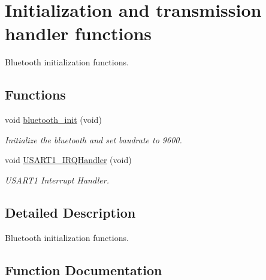 \hypertarget{group___bluetooth___init}{}\section{Initialization and transmission handler functions}
\label{group___bluetooth___init}


Bluetooth initialization functions.  


\subsection*{Functions}
\begin{DoxyCompactItemize}
\item 
void \hyperlink{group___bluetooth___init_gaaa60810e0857e9e1e5b2cba80b8db3ff}{bluetooth\+\_\+init} (void)
\begin{DoxyCompactList}\small\item\em Initialize the bluetooth and set baudrate to 9600. \end{DoxyCompactList}\item 
void \hyperlink{group___bluetooth___init_ga7139cd4baabbbcbab0c1fe6d7d4ae1cc}{U\+S\+A\+R\+T1\+\_\+\+I\+R\+Q\+Handler} (void)
\begin{DoxyCompactList}\small\item\em U\+S\+A\+R\+T1 Interrupt Handler. \end{DoxyCompactList}\end{DoxyCompactItemize}


\subsection{Detailed Description}
Bluetooth initialization functions. 



\subsection{Function Documentation}
\mbox{\label{group___bluetooth___init_gaaa60810e0857e9e1e5b2cba80b8db3ff}} 
